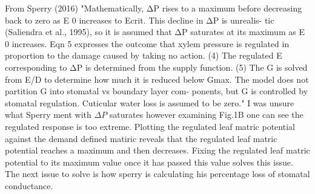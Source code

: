 \documentclass[a4paper]{article}\usepackage[]{graphicx}\usepackage[]{color}
\begin{document}
From Sperry (2016) "Mathematically, ΔP rises to a maximum before decreasing back to zero as E 0 increases to Ecrit. This decline in ΔP is unrealis- tic (Saliendra et al., 1995), so it is assumed that ΔP saturates at its maximum as E 0 increases. Eqn 5 expresses the outcome that xylem pressure is regulated in proportion to the damage caused by taking no action. (4) The regulated E corresponding to ΔP is determined from the supply function. (5) The G is solved from E/D to determine how much it is reduced below Gmax. The model does not partition G into stomatal vs boundary layer com- ponents, but G is controlled by stomatal regulation. Cuticular water loss is assumed to be zero." I was unsure what Sperry ment with $\Delta P$ saturates however examining Fig.1B one can see the regulated response is too extreme. Plotting the regulated leaf matric potential against the demand defined matiric reveals that the regulated leaf matric potential reaches a maximum and then decreases. Fixing the regulated leaf matric potential to its maximum value once it has passed this value solves this issue. The next issue to solve is how sperry is calculating his percentage loss of stomatal conductance.  



\end{document}
